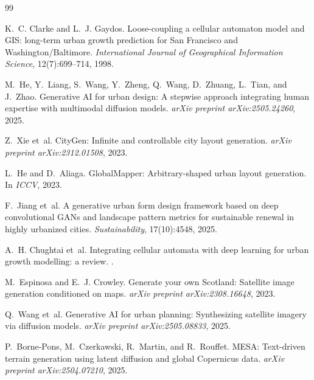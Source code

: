 \documentclass[11pt]{article}
\begin{document}

\begin{thebibliography}{99}

K.~C. Clarke and L.~J. Gaydos.
\newblock Loose-coupling a cellular automaton model and GIS: long-term urban
growth prediction for San Francisco and Washington/Baltimore.
\newblock \emph{International Journal of Geographical Information Science},
12(7):699--714, 1998.

M.~He, Y.~Liang, S.~Wang, Y.~Zheng, Q.~Wang, D.~Zhuang, L.~Tian, and J.~Zhao.
\newblock Generative AI for urban design: A stepwise approach integrating
human expertise with multimodal diffusion models.
\newblock \emph{arXiv preprint arXiv:2505.24260}, 2025.

Z.~Xie et~al.
\newblock CityGen: Infinite and controllable city layout generation.
\newblock \emph{arXiv preprint arXiv:2312.01508}, 2023.

L.~He and D.~Aliaga.
\newblock GlobalMapper: Arbitrary-shaped urban layout generation.
\newblock In \emph{ICCV}, 2023.

F.~Jiang et~al.
\newblock A generative urban form design framework based on deep
convolutional GANs and landscape pattern metrics for sustainable renewal in
highly urbanized cities.
\newblock \emph{Sustainability}, 17(10):4548, 2025.

A.~H. Chughtai et~al.
\newblock Integrating cellular automata with deep learning for urban growth
modelling: a review.
.

M.~Espinosa and E.~J. Crowley.
\newblock Generate your own Scotland: Satellite image generation conditioned
on maps.
\newblock \emph{arXiv preprint arXiv:2308.16648}, 2023.

Q.~Wang et~al.
\newblock Generative AI for urban planning: Synthesizing satellite imagery
via diffusion models.
\newblock \emph{arXiv preprint arXiv:2505.08833}, 2025.

P.~Borne-Pons, M.~Czerkawski, R.~Martin, and R.~Rouffet.
\newblock MESA: Text-driven terrain generation using latent diffusion and
global Copernicus data.
\newblock \emph{arXiv preprint arXiv:2504.07210}, 2025.


\end{thebibliography}
\end{document}

